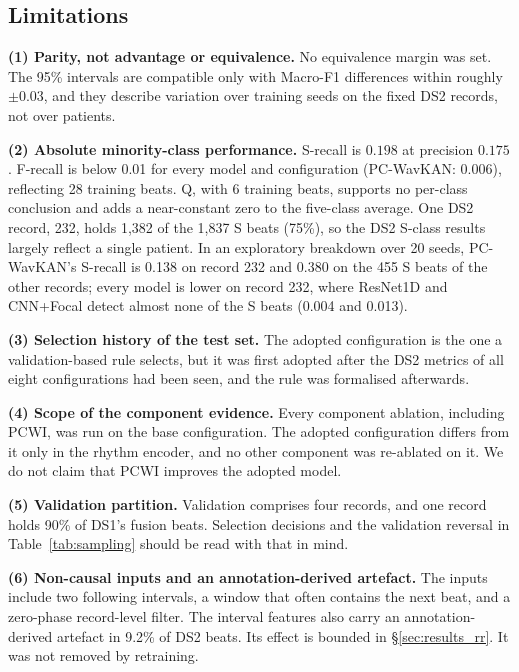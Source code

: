\documentclass[preprint,12pt]{elsarticle}
\begin{document}
\subsection{Limitations}
\label{sec:limitations}
\noindent\textbf{(1) Parity, not advantage or equivalence.} No equivalence margin was set. The 95\% intervals are compatible only with Macro-F1 differences within roughly $\pm0.03$, and they describe variation over training seeds on the fixed DS2 records, not over patients.

\noindent\textbf{(2) Absolute minority-class performance.} S-recall is $0.198$ at precision $0.175$. F-recall is below 0.01 for every model and configuration (PC-WavKAN: $0.006$), reflecting 28 training beats. Q, with 6 training beats, supports no per-class conclusion and adds a near-constant zero to the five-class average. One DS2 record, 232, holds 1,382 of the 1,837 S beats (75\%), so the DS2 S-class results largely reflect a single patient. In an exploratory breakdown over 20 seeds, PC-WavKAN's S-recall is 0.138 on record 232 and 0.380 on the 455 S beats of the other records; every model is lower on record 232, where ResNet1D and CNN+Focal detect almost none of the S beats (0.004 and 0.013).

\noindent\textbf{(3) Selection history of the test set.} The adopted configuration is the one a validation-based rule selects, but it was first adopted after the DS2 metrics of all eight configurations had been seen, and the rule was formalised afterwards.

\noindent\textbf{(4) Scope of the component evidence.} Every component ablation, including PCWI, was run on the base configuration. The adopted configuration differs from it only in the rhythm encoder, and no other component was re-ablated on it. We do not claim that PCWI improves the adopted model.

\noindent\textbf{(5) Validation partition.} Validation comprises four records, and one record holds 90\% of DS1's fusion beats. Selection decisions and the validation reversal in Table~\ref{tab:sampling} should be read with that in mind.

\noindent\textbf{(6) Non-causal inputs and an annotation-derived artefact.} The inputs include two following intervals, a window that often contains the next beat, and a zero-phase record-level filter. The interval features also carry an annotation-derived artefact in 9.2\% of DS2 beats. Its effect is bounded in \S\ref{sec:results_rr}. It was not removed by retraining.
\end{document}
